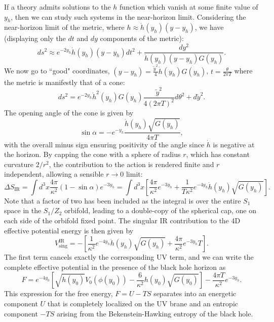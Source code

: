 \documentclass[12pt]{article}
\renewcommand{\tilde}{\widetilde} %
\begin{document}
If a theory admits solutions to the $h$ function which vanish at some finite value of $y_h$, then we can study such systems in the near-horizon limit.  Considering the near-horizon limit of the metric, where $h\approx \dot{h}(y_h) ( y-y_h )$, we have (displaying only the $dt$ and $dy$ components of the metric):
\begin{equation}
ds^2 \approx e^{-2y_h} \dot{h}(y_h) (y-y_h) dt^2 + \frac{dy^2}{\dot{h}(y_h) (y-y_h) G(y_h)}.
\end{equation}
We now go to ``good" coordinates, $( y-y_h ) = \frac{\tilde{y}^2}{4} \dot{h}(y_h) G(y_h) $,  $t = \frac{\theta}{2 \pi T}$ where the metric is manifestly that of a cone:
\begin{equation}
ds^2 = e^{-2 y_h} \dot{h}^2(y_h) G(y_h) \frac{\tilde{y}^2}{4(2 \pi T)^2} d\theta^2 + d\tilde{y}^2.
\end{equation}
The opening angle of the cone is given by
\begin{equation}
\sin \alpha = -e^{-y_h} \frac{\dot{h} (y_h) \sqrt{G(y_h)} }{4 \pi T},
\end{equation}
with the overall minus sign ensuring positivity of the angle since $\dot{h}$ is negative at the horizon.  By capping the cone with a sphere of radius $r$, which has constant curvature $2/r^2$, the contribution to the action is rendered finite and $r$ independent, allowing a sensible $r\rightarrow 0$ limit:
\begin{equation}
\Delta S_\text{IR} = \int d^3 x \frac{4 \pi}{\kappa^2} \left( 1- \sin \alpha \right) e^{-3y_h} = \int d^3 x\left[ \frac{4 \pi}{\kappa^2} e^{-3 y_h} +\frac{1}{T \kappa^2} e^{-4 y_h} \dot{h}(y_h) \sqrt{G(y_h)}  \right].
\end{equation} 
Note that a factor of two has been included as the integral is over the entire $S_1$ space in the $S_1/Z_2$ orbifold, leading to a double-copy of the spherical cap, one on each side of the orbifold fixed point. The singular IR contribution to the 4D effective potential energy is then given by 
\begin{equation}
V_\text{sing}^\text{IR} = -\left[  \frac{1}{ \kappa^2} e^{-4 y_h} \dot{h}(y_h) \sqrt{G(y_h)}  +\frac{4 \pi}{\kappa^2} e^{-3 y_h} T \right].
\end{equation}
The first term cancels exactly the corresponding UV term, and we can write the complete effective potential in the presence of the black hole horizon as
\begin{equation}
F = e^{-4 y_0} \left[ \sqrt{h(y_0)} V_0 (\phi(y_0)) - \frac{6}{\kappa^2} h(y_0) \sqrt{G(y_0)} \right] - \frac{4 \pi T}{\kappa^2} e^{-3 y_h}.
\label{eq:ftpot}
\end{equation}
This expression for the free energy, $F = U - TS$ separates into an energetic component $U$ that is completely localized on the UV brane and an entropic component $-TS$ arising from the Bekenstein-Hawking entropy of the black hole.
\end{document}
